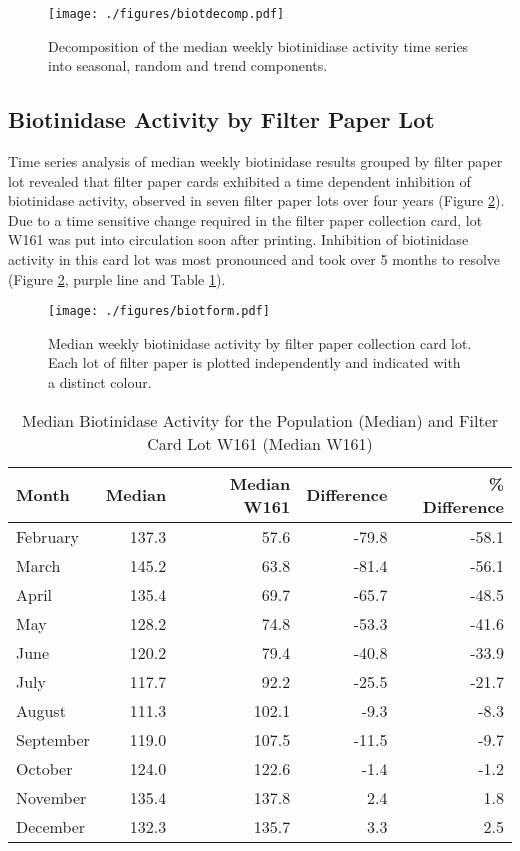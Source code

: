 \documentclass[review]{elsarticle}
\begin{document}
\begin{figure}[htbp]
\centering
\texttt{[image: ./figures/biotdecomp.pdf]}
\caption{\label{fig:orgd02ac03}Decomposition of the median weekly biotinidiase activity time series into seasonal, random and trend components.}
\end{figure}

\clearpage

\subsection*{Biotinidase Activity by Filter Paper Lot}
\label{sec:org0c70190}
Time series analysis of median weekly biotinidase results grouped by
filter paper lot revealed that filter paper cards exhibited a time
dependent inhibition of biotinidase activity, observed in seven filter
paper lots over four years (Figure \ref{fig:org17f54a4}). Due to a time sensitive
change required in the filter paper collection card, lot W161 was put into
circulation soon after printing. Inhibition of biotinidase activity in
this card lot was most pronounced and took over 5 months to resolve
(Figure \ref{fig:org17f54a4}, purple line and Table \ref{tab:w161_months}).

\begin{figure}[htbp]
\centering
\texttt{[image: ./figures/biotform.pdf]}
\caption{\label{fig:org17f54a4}Median weekly biotinidase activity by filter paper collection card lot. Each lot of filter paper is plotted independently and indicated with a distinct colour.}
\end{figure}

\clearpage

\begin{table}[ht]
\centering
\begin{tabular}{lrrrr}
  \hline
Month & Median & Median W161 & Difference & \% Difference \\ 
  \hline
February & 137.3 & 57.6 & -79.8 & -58.1 \\ 
  March & 145.2 & 63.8 & -81.4 & -56.1 \\ 
  April & 135.4 & 69.7 & -65.7 & -48.5 \\ 
  May & 128.2 & 74.8 & -53.3 & -41.6 \\ 
  June & 120.2 & 79.4 & -40.8 & -33.9 \\ 
  July & 117.7 & 92.2 & -25.5 & -21.7 \\ 
  August & 111.3 & 102.1 & -9.3 & -8.3 \\ 
  September & 119.0 & 107.5 & -11.5 & -9.7 \\ 
  October & 124.0 & 122.6 & -1.4 & -1.2 \\ 
  November & 135.4 & 137.8 & 2.4 & 1.8 \\ 
  December & 132.3 & 135.7 & 3.3 & 2.5 \\ 
   \hline
\end{tabular}
\caption{Median Biotinidase Activity for the Population (Median) and Filter Card Lot W161 (Median W161)} 
\label{tab:w161_months}
\end{table}
\end{document}

